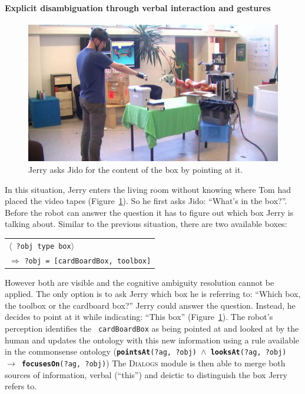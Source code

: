 \documentclass[preprint,3p,times]{elsarticle}
\newcommand{\stmt}[1]{{\footnotesize \tt $\langle$ #1\relax$\rangle$}}
\begin{document}
\paragraph{Explicit disambiguation through verbal interaction and gestures}

\begin{figure}[!ht]
  \centering
  \includegraphics[width=0.9\linewidth]{inTheBox2.jpg}
\caption{Jerry asks Jido for the content of the box by pointing at it.}
  \label{fig|pointing}
\end{figure}

In this situation, Jerry enters the living room without knowing where Tom had
placed the video tapes (Figure~\ref{fig|pointing}). So he first asks Jido:
``What's in the box?''. Before the robot can answer the question it has to
figure out which box Jerry is talking about. Similar to the previous situation,
there are two available boxes: 

\begin{center}
\begin{tabular}{l}
\stmt{?obj type box}\\
\hspace{0.7cm}$\Rightarrow$ {\tt ?obj = [cardBoardBox, toolbox]}
\end{tabular}
\end{center}

However both are visible and the cognitive ambiguity resolution cannot be
applied. The only option is to ask Jerry which box he is referring to: ``Which
box, the toolbox or the cardboard box?'' Jerry could answer the
question. Instead, he decides to point at it while indicating: ``This box''
(Figure~\ref{fig|pointing}). The robot's perception identifies the {\tt
cardBoardBox} as being pointed at and looked at by the human and updates the
ontology with this new information using a rule available in the commonsense
ontology ({\tt \textbf{pointsAt}(?ag, ?obj) $\land$ \textbf{looksAt}(?ag, ?obj) $\to$
\textbf{focusesOn}(?ag, ?obj)}) The \textsc{Dialogs} module is then able to merge both
sources of information, verbal (``this'') and deictic to distinguish the box
Jerry refers to.
\end{document}
